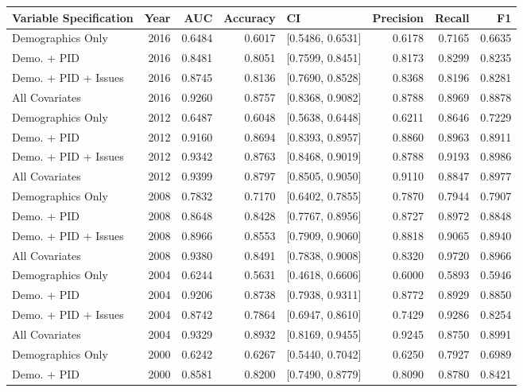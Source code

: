 \begin{longtable}{lrrrlrrr}
  \toprule
Variable Specification & Year & AUC & Accuracy & CI & Precision & Recall & F1 \\ 
  \midrule
Demographics Only & 2016 & 0.6484 & 0.6017 & [0.5486, 0.6531] & 0.6178 & 0.7165 & 0.6635 \\ 
  Demo. + PID & 2016 & 0.8481 & 0.8051 & [0.7599, 0.8451] & 0.8173 & 0.8299 & 0.8235 \\ 
  Demo. + PID + Issues & 2016 & 0.8745 & 0.8136 & [0.7690, 0.8528] & 0.8368 & 0.8196 & 0.8281 \\ 
  All Covariates & 2016 & 0.9260 & 0.8757 & [0.8368, 0.9082] & 0.8788 & 0.8969 & 0.8878 \\ 
  Demographics Only & 2012 & 0.6487 & 0.6048 & [0.5638, 0.6448] & 0.6211 & 0.8646 & 0.7229 \\ 
  Demo. + PID & 2012 & 0.9160 & 0.8694 & [0.8393, 0.8957] & 0.8860 & 0.8963 & 0.8911 \\ 
  Demo. + PID + Issues & 2012 & 0.9342 & 0.8763 & [0.8468, 0.9019] & 0.8788 & 0.9193 & 0.8986 \\ 
  All Covariates & 2012 & 0.9399 & 0.8797 & [0.8505, 0.9050] & 0.9110 & 0.8847 & 0.8977 \\ 
  Demographics Only & 2008 & 0.7832 & 0.7170 & [0.6402, 0.7855] & 0.7870 & 0.7944 & 0.7907 \\ 
  Demo. + PID & 2008 & 0.8648 & 0.8428 & [0.7767, 0.8956] & 0.8727 & 0.8972 & 0.8848 \\ 
  Demo. + PID + Issues & 2008 & 0.8966 & 0.8553 & [0.7909, 0.9060] & 0.8818 & 0.9065 & 0.8940 \\ 
  All Covariates & 2008 & 0.9380 & 0.8491 & [0.7838, 0.9008] & 0.8320 & 0.9720 & 0.8966 \\ 
  Demographics Only & 2004 & 0.6244 & 0.5631 & [0.4618, 0.6606] & 0.6000 & 0.5893 & 0.5946 \\ 
  Demo. + PID & 2004 & 0.9206 & 0.8738 & [0.7938, 0.9311] & 0.8772 & 0.8929 & 0.8850 \\ 
  Demo. + PID + Issues & 2004 & 0.8742 & 0.7864 & [0.6947, 0.8610] & 0.7429 & 0.9286 & 0.8254 \\ 
  All Covariates & 2004 & 0.9329 & 0.8932 & [0.8169, 0.9455] & 0.9245 & 0.8750 & 0.8991 \\ 
  Demographics Only & 2000 & 0.6242 & 0.6267 & [0.5440, 0.7042] & 0.6250 & 0.7927 & 0.6989 \\ 
  Demo. + PID & 2000 & 0.8581 & 0.8200 & [0.7490, 0.8779] & 0.8090 & 0.8780 & 0.8421 \\ 

\end{longtable}
